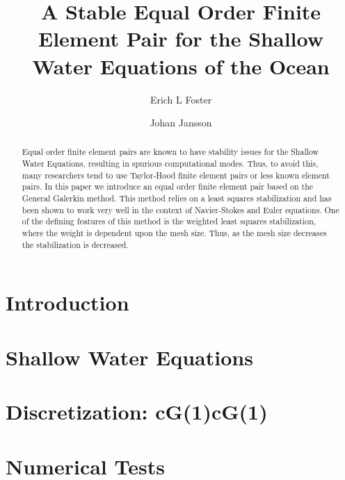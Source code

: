 \documentclass{elsarticle}
\begin{document}
  \begin{frontmatter}
    \author[1]{Erich L Foster}

    \author[1]{Johan Jansson}

    \address[1]{Basque Center for Applied Mathematics, Alameda Mazarredo, 14,
      48009 Bilbao, Basque Country -- Spain}

    \title{A Stable Equal Order Finite Element Pair for the Shallow Water
    Equations of the Ocean}

    \begin{abstract}
      Equal order finite element pairs are known to have stability issues for
      the Shallow Water Equations, resulting in spurious computational modes.
      Thus, to avoid this, many researchers tend to use Taylor-Hood finite
      element pairs or less known element pairs. In this paper we introduce an
      equal order finite element pair based on the General Galerkin method. This
      method relies on a least squares stabilization and has been shown to work
      very well in the context of Navier-Stokes and Euler equations. One of the
      defining features of this method is the weighted least squares
      stabilization, where the weight is dependent upon the mesh size. Thus, as
      the mesh size decreases the stabilization is decreased.
    \end{abstract}
  \end{frontmatter}

  \section{Introduction} \label{sec:Intro}
  

  \section{Shallow Water Equations} \label{sec:SWE}
  

  \section{Discretization: cG(1)cG(1)} \label{sec:Discrete}
  

  \section{Numerical Tests} \label{sec:Tests}
  

  
  
\end{document}
